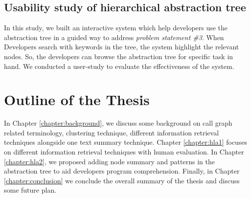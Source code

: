 \subsection{Usability study of hierarchical abstraction tree}

In this study, we built an interactive system which help developers use the abstraction tree in a guided way to address \emph{problem statement \#3}. When Developers search with keywords in the tree, the system highlight the relevant nodes. So, the developers can browse the abstraction tree for specific task in hand. We conducted a user-study to evaluate the effectiveness of the system. 


\section{Outline of the Thesis}
In Chapter \ref{chapter:background}, we discuss some background on call graph related terminology, clustering technique, different information retrieval techniques alongside one text summary technique. Chapter \ref{chapter:hla1} focuses on different information retrieval techniques with human evaluation. In Chapter \ref{chapter:hla2}, we proposed adding node summary and patterns in the abstraction tree to aid developers program comprehension. Finally, in Chapter \ref{chapter:conclusion} we conclude the overall summary of the thesis and discuss some future plan. 
